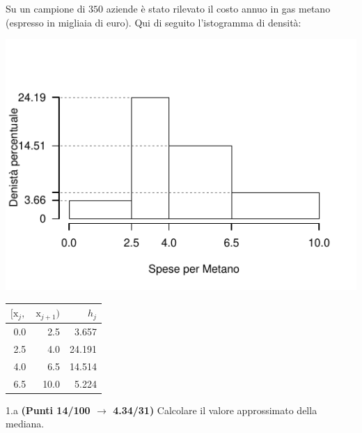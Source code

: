 \documentclass[
  11pt,
]{book}
\theoremstyle{mytheoremstyle}
\theoremstyle{mydefstyle}
\begin{document}
Su un campione di \(350\) aziende è stato rilevato il costo annuo in gas metano (espresso in migliaia di euro). Qui di seguito l'istogramma di densità:

\begin{center}\includegraphics{Esami_passati_con_soluzioni_files/figure-latex/2021-69-1} \end{center}

\begin{table}[H]
\centering
\begin{tabular}{rrr}
\toprule
$[\text{x}_j,$ & $\text{x}_{j+1})$ & $h_j$\\
\midrule
0.0 & 2.5 & 3.657\\
2.5 & 4.0 & 24.191\\
4.0 & 6.5 & 14.514\\
6.5 & 10.0 & 5.224\\
\bottomrule
\end{tabular}
\end{table}

1.a \textbf{(Punti 14/100 \(\rightarrow\) 4.34/31)} Calcolare il valore approssimato della mediana.
\end{document}
